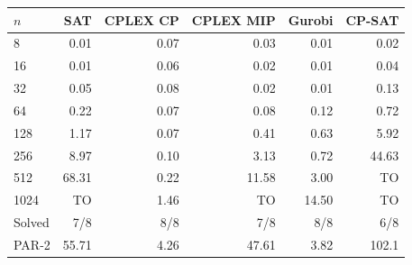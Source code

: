 \begin{tabular}{lrrrrr}
\toprule
$n$ & SAT & CPLEX CP & CPLEX MIP & Gurobi & CP-SAT \\
\midrule
8 & 0.01 & 0.07 & 0.03 & 0.01 & 0.02 \\
16 & 0.01 & 0.06 & 0.02 & 0.01 & 0.04 \\
32 & 0.05 & 0.08 & 0.02 & 0.01 & 0.13 \\
64 & 0.22 & 0.07 & 0.08 & 0.12 & 0.72 \\
128 & 1.17 & 0.07 & 0.41 & 0.63 & 5.92 \\
256 & 8.97 & 0.10 & 3.13 & 0.72 & 44.63 \\
512 & 68.31 & 0.22 & 11.58 & 3.00 & TO \\
1024 & TO & 1.46 & TO & 14.50 & TO \\
Solved & 7/8 & 8/8 & 7/8 & 8/8 & 6/8 \\
PAR-2 & 55.71 & 4.26 & 47.61 & 3.82 & 102.1 \\
\bottomrule
\end{tabular}
